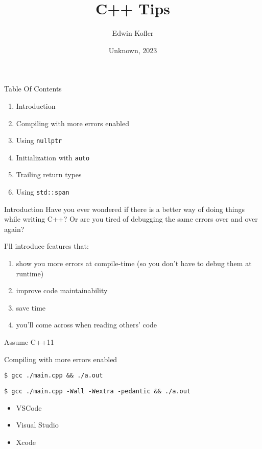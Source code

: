 \documentclass[t]{beamer}
\title{C++ Tips}
\author{Edwin Kofler}
\institute{El Camino College Computer Science Club}
\date{Unknown, 2023}
\begin{document}
\frame{\titlepage}


\begin{frame}{Table Of Contents}
	\begin{enumerate}
		\item Introduction
		\item Compiling with more errors enabled
		\item Using \texttt{nullptr}
		\item Initialization with \texttt{auto}
		\item Trailing return types
		\item Using \texttt{std::span}
	\end{enumerate}
\end{frame}


\begin{frame}{Introduction}
	Have you ever wondered if there is a better way of doing things while writing C++?
	Or are you tired of debugging the same errors over and over again?

	\vspace{10px}
	I'll introduce features that:
	\begin{enumerate}
		\item show you more errors at compile-time (so you don't have to debug them at runtime)
		\item improve code maintainability
		\item save time
		\item you'll come across when reading others' code
	\end{enumerate}

	\vspace{10px}
	Assume C++11
\end{frame}

\begin{frame}[fragile]{Compiling with more errors enabled}
	\begin{verbatim}
$ gcc ./main.cpp && ./a.out
	\end{verbatim}

	\begin{verbatim}
$ gcc ./main.cpp -Wall -Wextra -pedantic && ./a.out
	\end{verbatim}

	\begin{itemize}
		\item VSCode
		\item Visual Studio
		\item Xcode
	\end{itemize}
\end{frame}
\end{document}
